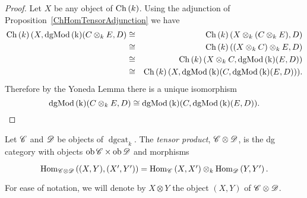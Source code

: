 \documentclass[dissertation.tex]{subfiles}
\begin{document}
\begin{eg}
\begin{description}[style=nextline]
\begin{prop}
      \begin{proof}
        Let $X$ be any object of $\operatorname{Ch}\left(k\right)$.
        Using the adjunction of Proposition~\ref{ChHomTensorAdjunction} we have
        \begin{eqnarray*}
          \operatorname{Ch}\left(k\right)(X,\operatorname{dgMod\left(k\right)}(C \otimes_k E, D) &\cong& 
          \operatorname{Ch}\left(k\right)(X \otimes_k (C \otimes_k E), D)\\
          &\cong& \operatorname{Ch}\left(k\right)((X \otimes_k C) \otimes_k E, D)\\
          &\cong& \operatorname{Ch}\left(k\right)(X \otimes_k C, \operatorname{dgMod\left(k\right)}(E,D))\\
          &\cong& \operatorname{Ch}\left(k\right)(X, \operatorname{dgMod\left(k\right)}(C, \operatorname{dgMod\left(k\right)}(E,D))).
        \end{eqnarray*}
        Therefore by the Yoneda Lemma there is a unique isomorphism 
        $$\operatorname{dgMod\left(k\right)}(C \otimes_k E, D) \cong \operatorname{dgMod\left(k\right)}(C, \operatorname{dgMod\left(k\right)}(E,D)).$$
      \end{proof}
    \end{prop}
  \end{description}
\end{eg}

\begin{defn}
  Let $\mathscr{C}$ and $\mathscr{D}$ be objects of $\operatorname{dgcat}_k$.
  The {\it tensor product}, $\mathscr{C} \otimes \mathscr{D}$, is the dg category with objects $\operatorname{ob}\mathscr{C} \times \operatorname{ob}\mathscr{D}$ and
  morphisms
  $$\begin{tikzcd}
    \Hom{\CC \otimes \D}{(X, Y), (X^\prime, Y^\prime)} = \Hom{\CC}{X,X^\prime} \otimes_k \Hom{\D}{Y,Y^\prime}.
  \end{tikzcd}$$
  For ease of notation, we will denote by $X \otimes Y$ the object $(X,Y)$ of $\mathscr{C} \otimes \mathscr{D}$.
\end{defn}
\end{document}
